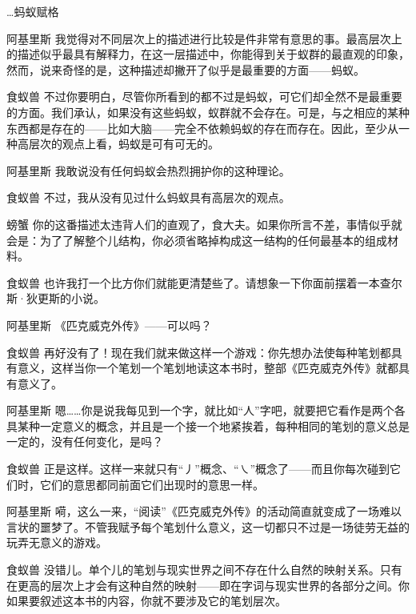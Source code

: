 \begin{dialog}{…蚂蚁赋格}
\begin{dialogue}
\item[阿基里斯]我觉得对不同层次上的描述进行比较是件非常有意思的事。最高层次上的描述似乎最具有解释力，在这一层描述中，你能得到关于蚁群的最直观的印象，然而，说来奇怪的是，这种描述却撇开了似乎是最重要的方面——蚂蚁。

\item[食蚁兽]不过你要明白，尽管你所看到的都不过是蚂蚁，可它们却全然不是最重要的方面。我们承认，如果没有这些蚂蚁，蚁群就不会存在。可是，与之相应的某种东西都是存在的——比如大脑——完全不依赖蚂蚁的存在而存在。因此，至少从一种高层次的观点上看，蚂蚁是可有可无的。

\item[阿基里斯]我敢说没有任何蚂蚁会热烈拥护你的这种理论。

\item[食蚁兽]不过，我从没有见过什么蚂蚁具有高层次的观点。

\item[螃蟹]你的这番描述太违背人们的直观了，食大夫。如果你所言不差，事情似乎就会是：为了了解整个儿结构，你必须省略掉构成这一结构的任何最基本的组成材料。

\item[食蚁兽]也许我打一个比方你们就能更清楚些了。请想象一下你面前摆着一本查尔斯·狄更斯的小说。

\item[阿基里斯]《匹克威克外传》——可以吗？

\item[食蚁兽]再好没有了！现在我们就来做这样一个游戏：你先想办法使每种笔划都具有意义，这样当你一个笔划一个笔划地读这本书时，整部《匹克威克外传》就都具有意义了。

\item[阿基里斯]嗯……你是说我每见到一个字，就比如“人”字吧，就要把它看作是两个各具某种一定意义的概念，并且是一个接一个地紧挨着，每种相同的笔划的意义总是一定的，没有任何变化，是吗？

\item[食蚁兽]正是这样。这样一来就只有“丿”概念、“{㇏}”概念了——而且你每次碰到它们时，它们的意思都同前面它们出现时的意思一样。

\item[阿基里斯]嗬，这么一来，“阅读”《匹克威克外传》的活动简直就变成了一场难以言状的噩梦了。不管我赋予每个笔划什么意义，这一切都只不过是一场徒劳无益的玩弄无意义的游戏。

\item[食蚁兽]没错儿。单个儿的笔划与现实世界之间不存在什么自然的映射关系。只有在更高的层次上才会有这种自然的映射——即在字词与现实世界的各部分之间。你如果要叙述这本书的内容，你就不要涉及它的笔划层次。


\end{dialogue}
\end{dialog}
